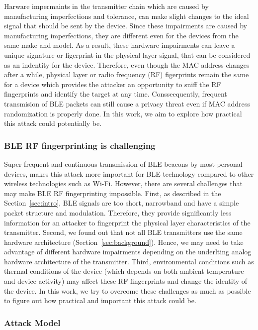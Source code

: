 Harware impermaints in the transmitter chain which are caused by manufacturing imperfections and tolerance, can make slight changes to the ideal signal that should be sent by the device. Since these impairments are caused by manufacturing imperfections, they are different even for the devices from the same make and model. As a result, these hardware impairments can leave a unique signature or figerprint in the physical layer signal, that can be considered as an indentity for the device. Therefore, even though the MAC address changes after a while, physical layer or radio frequency (RF) figerprints remain the same for a device which provides the attacker an opportunity to sniff the RF fingerprints and identify the target at any time. Consseequently, frequent transmision of BLE packets can still cause a privacy threat even if MAC address randomization is properly done. In this work, we aim to explore how practical this attack could potentially be.

\subsubsection*{BLE RF fingerprinting is challenging}
Super frequent and continuous transmission of BLE beacons by most personal devices, makes this attack more important for BLE technology compared to other wireless technologies such as Wi-Fi. However, there are several challenges that may make BLE RF fingerprinting impossible. First, as described in the Section~\ref{sec:intro}, BLE signals are too short, narrowband and have a simple packet structure and modulation. Therefore, they provide significantly less information for an attacker to fingerprint the physical layer characteristics of the transmitter. Second, we found out that not all BLE transmitters use the same hardware architecture (Section~\ref{sec:background}). Hence, we may need to take advantage of different hardware impairments depending on the underlting analog hardware architecture of the transmitter. Third, environmental conditions such as thermal conditions of the device (which depends on both ambient temperature and device activity) may affect these RF fingerprints and change the identity of the device. In this work, we try to overcome these challenges as much as possible to figure out how practical and important this attack could be.



\subsubsection*{Attack Model}

